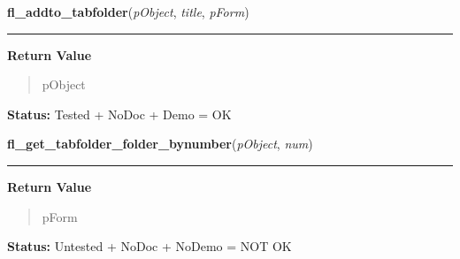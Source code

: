     \label{xformslib:library:fl_addto_tabfolder}

    \vspace{0.5ex}

\hspace{.8\funcindent}\begin{boxedminipage}{\funcwidth}

    \raggedright \textbf{fl\_addto\_tabfolder}(\textit{pObject}, \textit{title}, \textit{pForm})

    \vspace{-1.5ex}

    \rule{\textwidth}{0.5\fboxrule}
\setlength{\parskip}{2ex}
\setlength{\parskip}{1ex}
      \textbf{Return Value}
    \vspace{-1ex}

      \begin{quote}
      pObject

      \end{quote}

\textbf{Status:} Tested + NoDoc + Demo = OK



    \end{boxedminipage}

    \label{xformslib:library:fl_get_tabfolder_folder_bynumber}

    \vspace{0.5ex}

\hspace{.8\funcindent}\begin{boxedminipage}{\funcwidth}

    \raggedright \textbf{fl\_get\_tabfolder\_folder\_bynumber}(\textit{pObject}, \textit{num})

    \vspace{-1.5ex}

    \rule{\textwidth}{0.5\fboxrule}
\setlength{\parskip}{2ex}
\setlength{\parskip}{1ex}
      \textbf{Return Value}
    \vspace{-1ex}

      \begin{quote}
      pForm

      \end{quote}

\textbf{Status:} Untested + NoDoc + NoDemo = NOT OK



    \end{boxedminipage}

